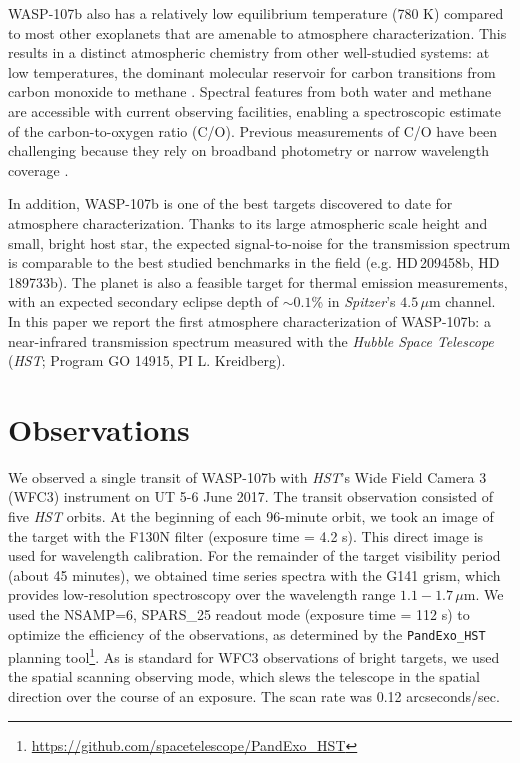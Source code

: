 \documentclass[twocolumn]{aastex61}
\begin{document}
WASP-107b also has a relatively low equilibrium temperature (780 K) compared to most other exoplanets that are amenable to atmosphere characterization.  This results in a distinct atmospheric chemistry from other well-studied systems: at low temperatures, the dominant molecular reservoir for carbon transitions from carbon monoxide to methane \citep{moses13}.  Spectral features from both water and methane are accessible with current observing facilities, enabling a spectroscopic estimate of the carbon-to-oxygen ratio (C/O). Previous measurements of C/O have been challenging because they rely on broadband photometry or narrow wavelength coverage \citep[e.g.][]{madhusudhan11, line14, benneke15, kreidberg15b}. 

In addition, WASP-107b is one of the best targets discovered to date for atmosphere characterization. Thanks to its large atmospheric scale height and small, bright host star, the expected signal-to-noise for the transmission spectrum is comparable to the best studied benchmarks in the field (e.g. HD\,209458b, HD\,189733b). The planet is also a feasible target for thermal emission measurements, with an expected secondary eclipse depth of $\sim0.1$\% in \emph{Spitzer}'s $4.5\,\mu$m channel. In this paper we report the first atmosphere characterization of WASP-107b: a near-infrared transmission spectrum measured with the \emph{Hubble Space Telescope} (\emph{HST}; Program GO 14915, PI L. Kreidberg).

\section{Observations}
We observed a single transit of WASP-107b with \emph{HST}'s Wide Field Camera 3 (WFC3) instrument on UT 5-6 June 2017.  The transit observation consisted of five \emph{HST} orbits. At the beginning of each 96-minute orbit, we took an image of the target with the F130N filter (exposure time = 4.2 s). This direct image is used for wavelength calibration. For the remainder of the target visibility period (about 45 minutes), we obtained time series spectra with the G141 grism, which provides low-resolution spectroscopy over the wavelength range $1.1 - 1.7\,\mu$m.  We used the NSAMP=6, SPARS\_25 readout mode (exposure time = 112 s) to optimize the efficiency of the observations, as determined by the \texttt{PandExo\_HST} planning tool\footnote{\url{https://github.com/spacetelescope/PandExo\_HST}}.  As is standard for WFC3 observations of bright targets, we used the spatial scanning observing mode, which slews the telescope in the spatial direction over the course of an exposure. The scan rate was 0.12 arcseconds/sec.
\end{document}
